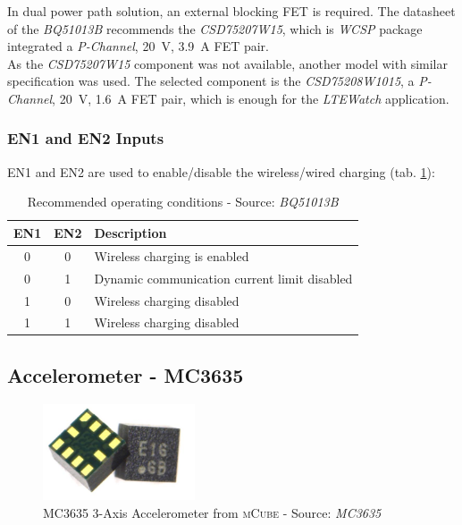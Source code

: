 \documentclass[report.tex]{subfiles}
\begin{document}
In dual power path solution, an external blocking FET is required. The datasheet of the \textit{BQ51013B} recommends the \textit{CSD75207W15}, which is \textit{WCSP} package integrated a \textit{P-Channel}, \SI{20}{\volt}, \SI{3.9}{\ampere} FET pair.\\

As the \textit{CSD75207W15} component was not available, another model with similar specification was used. The selected component is the \textit{CSD75208W1015}, a \textit{P-Channel}, \SI{20}{\volt}, \SI{1.6}{\ampere} FET pair, which is enough for the \textit{LTEWatch} application.

\subsubsection{EN1 and EN2 Inputs}

EN1 and EN2 are used to enable/disable the wireless/wired charging (tab. \ref{tab:bq51013b_en1_en2}):

\begin{table}[H]
\centering
\begin{tabular}{|c|c|l|}\hline
\textbf{EN1} & \textbf{EN2} & \textbf{Description}\\\hline
0 & 0 & Wireless charging is enabled\\\hline
0 & 1 & Dynamic communication current limit disabled\\\hline
1 & 0 & Wireless charging disabled\\\hline
1 & 1 & Wireless charging disabled\\\hline
\end{tabular}
\caption{Recommended operating conditions - Source: \textit{BQ51013B}\cite{BQ51013B}}
\label{tab:bq51013b_en1_en2}
\end{table}



\subsection{Accelerometer - MC3635}
\begin{figure}[H]
	\centering
	\includegraphics[width=0.4\textwidth]{Include/Figure/comp/MC3635_picti.png}
	\caption{MC3635 3-Axis Accelerometer from \textsc{mCube} - Source: \textit{MC3635}\cite{MC3635}}
	\label{fig:MC3635_picti}
\end{figure}
\end{document}
